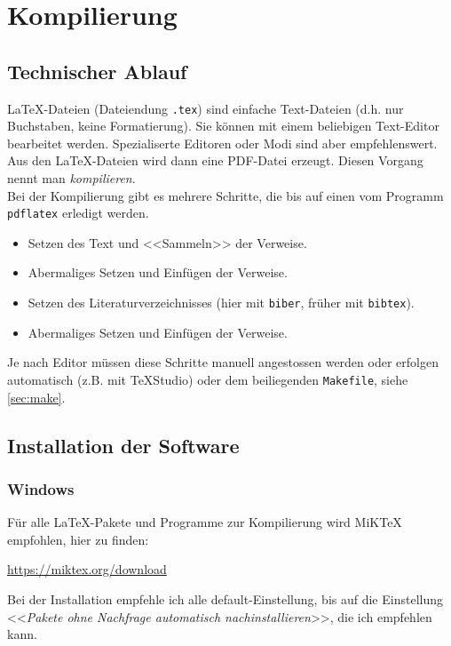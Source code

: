 \chapter{Kompilierung}\label{sec:compilieren}

\section{Technischer Ablauf}
\LaTeX-Dateien (Dateiendung \texttt{.tex})
sind einfache Text-Dateien (d.h. nur Buchstaben, keine
Formatierung). 
Sie können mit einem beliebigen Text-Editor bearbeitet werden.
Spezialiserte Editoren oder Modi sind aber empfehlenswert.\\
%
Aus den \LaTeX-Dateien wird dann eine PDF-Datei erzeugt.
Diesen Vorgang nennt man {\em kompilieren}.\\
%
Bei der Kompilierung gibt es mehrere Schritte, die bis auf einen
vom Programm \texttt{pdflatex} erledigt werden.
\begin{itemize}
	\item Setzen des Text und <<Sammeln>> der Verweise.
	\item Abermaliges Setzen und Einfügen der Verweise.
	\item Setzen des Literaturverzeichnisses 
		(hier mit \texttt{biber}, früher mit \texttt{bibtex}).
	\item Abermaliges Setzen und Einfügen der Verweise.
\end{itemize}
Je nach Editor müssen diese Schritte manuell angestossen werden
oder erfolgen automatisch (z.B. mit \TeX{}Studio) oder dem 
beiliegenden \texttt{Makefile}, siehe \autoref{sec:make}.

\section{Installation der Software}

\subsection{Windows}\label{sec:windows}
Für alle \LaTeX{}-Pakete und Programme zur Kompilierung wird
MiK\TeX{} empfohlen, hier zu finden:
\begin{center}
\url{https://miktex.org/download}
\end{center}
\noindent Bei der Installation empfehle ich alle default-Einstellung, bis
auf die Einstellung 
<<{\em Pakete ohne Nachfrage automatisch nachinstallieren}>>, die
ich empfehlen kann.

